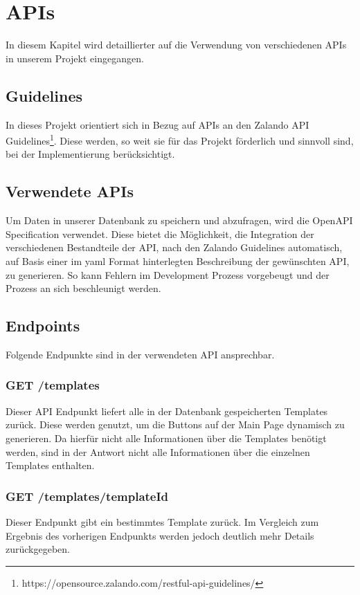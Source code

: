 \chapter{\ac{API}s}\label{ch:apis}
In diesem Kapitel wird detaillierter auf die Verwendung von verschiedenen \ac{API}s in unserem 
Projekt eingegangen.

\section{Guidelines}
In dieses Projekt orientiert sich in Bezug auf \ac{API}s an den Zalando API 
Guidelines\footnote{https://opensource.zalando.com/restful-api-guidelines/}.
Diese werden, so weit sie für das Projekt förderlich und sinnvoll sind, bei der Implementierung
berücksichtigt.

\section{Verwendete \ac{API}s}
Um Daten in unserer Datenbank zu speichern und abzufragen, wird die OpenAPI Specification
verwendet. Diese bietet die Möglichkeit, die Integration der verschiedenen Bestandteile der
\ac{API}, nach den Zalando Guidelines automatisch, auf Basis einer im \Gls{yaml} Format hinterlegten
Beschreibung der gewünschten \ac{API}, zu generieren. So kann Fehlern im Development
Prozess vorgebeugt und der Prozess an sich beschleunigt werden.

\section{Endpoints}
Folgende Endpunkte sind in der verwendeten \ac{API} ansprechbar.

\subsection{GET /templates}

Dieser \ac{API} Endpunkt liefert alle in der Datenbank gespeicherten Templates zurück. Diese
werden genutzt, um die Buttons auf der Main Page dynamisch zu generieren. Da hierfür nicht
alle Informationen über die Templates benötigt werden, sind in der Antwort nicht alle
Informationen über die einzelnen Templates enthalten.

\subsection{GET /templates/{templateId}}
Dieser Endpunkt gibt ein bestimmtes Template zurück. Im Vergleich zum Ergebnis des vorherigen
Endpunkts werden jedoch deutlich mehr Details zurückgegeben.

